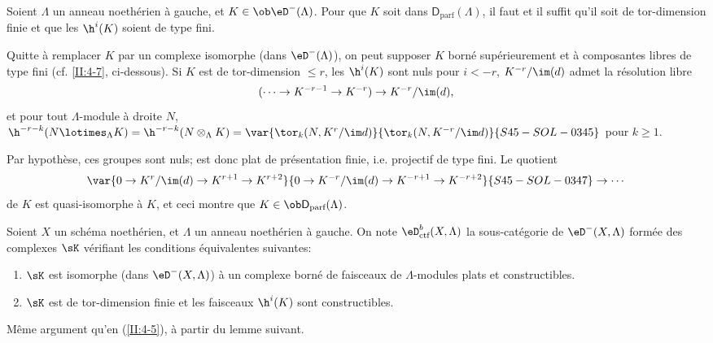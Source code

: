 \begin{lemma}\label{II:4-5-1} 
Soient $\Lambda$ un anneau noethérien à gauche, et $K\in\ob\eD^-(\Lambda)$. 
Pour que $K$ soit dans $\mathsf{D}_\text{parf}(\Lambda)$, il faut et il suffit 
qu'il soit de tor-dimension finie et que les $\h^i(K)$ soient de type fini.
\end{lemma}

Quitte à remplacer $K$ par un complexe isomorphe (dans $\eD^-(\Lambda)$), on 
peut supposer $K$ borné supérieurement et à composantes libres de type 
fini (cf. \ref{II:4-7}, ci-dessous). Si $K$ est de tor-dimension $\leqslant r$, 
les $\h^i(K)$ sont nuls pour $i<-r$, $K^{-r}/\im(d)$ admet la résolution 
libre 
\[
  (\cdots \to K^{-r-1} \to K^{-r}) \to K^{-r}/\im(d) \text{,}
\]
et pour tout $\Lambda$-module à droite $N$, 
$\h^{-r-k}(N\lotimes_\Lambda K) = \h^{-r-k}(N\otimes_\Lambda K) 
= \var{\tor_k(N,K^r/\im d)}{\tor_k(N,K^{-r}/\im d)}{S45-SOL-0345}$ pour $k\geqslant 1$. 

Par hypothèse, ces groupes sont nuls;  est donc plat de 
présentation finie, i.e. projectif de type fini. Le quotient 
\[
  \var{0 \to K^r/\im(d) \to K^{r+1} \to K^{r+2}}{0 \to K^{-r}/\im(d) \to K^{-r+1} \to K^{-r+2}}{S45-SOL-0347}\to \cdots 
\]
de $K$ est quasi-isomorphe à $K$, et ceci montre que 
$K\in\ob\mathsf{D}_\text{parf}(\Lambda)$. 





\begin{prop-def_}\label{II:4-6}
Soient $X$ un schéma noethérien, et $\Lambda$ un anneau noethérien à 
gauche. On note $\eD_\textnormal{ctf}^b(X,\Lambda)$ la sous-catégorie de 
$\eD^-(X,\Lambda)$ formée des complexes $\sK$ vérifiant les conditions 
équivalentes suivantes:
\begin{enumerate}[\indent i)]
  \item $\sK$ est isomorphe (dans $\eD^-(X,\Lambda)$) à un complexe borné de 
    faisceaux de $\Lambda$-modules plats et constructibles. 
  \item $\sK$ est de tor-dimension finie et les faisceaux $\h^i(K)$ sont 
    constructibles. 
\end{enumerate}
\end{prop-def_}

Même argument qu'en (\ref{II:4-5}), à partir du lemme suivant. 





